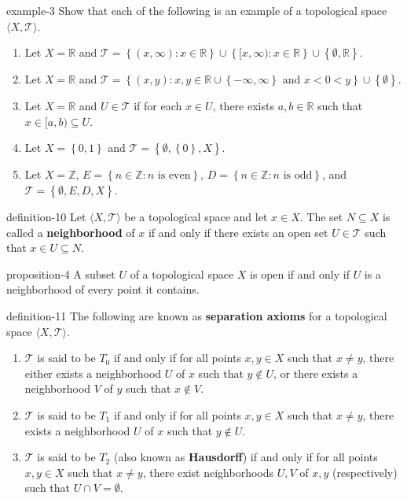 \documentclass[10pt,]{article}
\newcommand{\terminology}[1]{\textbf{#1}}
\newcommand{\tuple}[1]{\langle #1 \rangle}
\newcommand{\mb}{\mathbb}
\newcommand{\mc}{\mathcal}
\newcommand{\setBuilder}[2]{\left\{#1:#2\right\}}
\newcommand{\setList}[1]{\left\{#1\right\}}
\newcommand{\lt}{<}
\begin{document}
\begin{example}{}{example-3}%
\hypertarget{p-35}{}%
Show that each of the following is an example of a topological space \(\tuple{X,\mc T}\).%
\leavevmode%
\begin{enumerate}
\item\hypertarget{li-23}{}Let \(X=\mb R\) and \(\mc T=\setBuilder{(x,\infty)}{x\in\mb R}
\cup\setBuilder{[x,\infty)}{x\in\mb R}\cup\setList{\emptyset,\mb R}\).%
\item\hypertarget{li-24}{}Let \(X=\mb R\) and \(\mc T=\setBuilder{(x,y)}{
x,y\in\mb R\cup\setList{-\infty,\infty} \text{ and }x\lt 0\lt y
}\cup\setList{\emptyset}\).%
\item\hypertarget{li-25}{}Let \(X=\mb R\) and \(U\in\mc T\) if for each \(x\in U\), there exists \(a,b\in\mb R\) such that \(x\in[a,b)\subseteq U\).%
\item\hypertarget{li-26}{}Let \(X=\setList{0,1}\) and \(\mc T=\setList{\emptyset,\setList{0},X}\).%
\item\hypertarget{li-27}{}Let \(X=\mb Z\), \(E=\setBuilder{n\in\mb Z}{n\text{ is even}}\), \(D=\setBuilder{n\in\mb Z}{n\text{ is odd}}\), and \(\mc T=\setList{\emptyset,E,D,X}\).%
\end{enumerate}
\end{example}
\begin{definition}{}{definition-10}%
\hypertarget{p-36}{}%
Let \(\tuple{X,\mc T}\) be a topological space and let \(x\in X\). The set \(N\subseteq X\) is called a \terminology{neighborhood} of \(x\) if and only if there exists an open set \(U\in\mc T\) such that \(x\in U\subseteq N\).%
\end{definition}
\begin{proposition}{}{}{proposition-4}%
\hypertarget{p-37}{}%
A subset \(U\) of a topological space \(X\) is open if and only if \(U\) is a neighborhood of every point it contains.%
\end{proposition}
\begin{definition}{}{definition-11}%
\hypertarget{p-38}{}%
The following are known as \terminology{separation axioms} for a topological space \(\tuple{X,\mc T}\).%
\leavevmode%
\begin{enumerate}
\item\hypertarget{li-28}{}\(\mc T\) is said to be \terminology{\(T_0\)} if and only if for all points \(x,y\in X\) such that \(x\not=y\), there either exists a neighborhood \(U\) of \(x\) such that \(y\not\in U\), or there exists a neighborhood \(V\) of \(y\) such that \(x\not\in V\).%
\item\hypertarget{li-29}{}\(\mc T\) is said to be \terminology{\(T_1\)} if and only if for all points \(x,y\in X\) such that \(x\not=y\), there exists a neighborhood \(U\) of \(x\) such that \(y\not\in U\).%
\item\hypertarget{li-30}{}\(\mc T\) is said to be \terminology{\(T_2\)} (also known as \terminology{Hausdorff}) if and only if for all points \(x,y\in X\) such that \(x\not=y\), there exist neighborhoods \(U,V\) of \(x,y\) (respectively) such that \(U\cap V=\emptyset\).%
\end{enumerate}
\end{definition}
\end{document}
